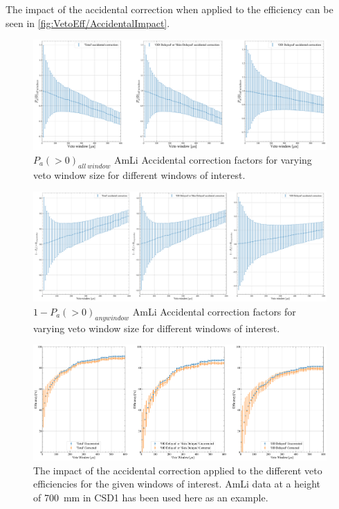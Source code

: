 The impact of the accidental correction when applied to the efficiency can be seen in \autoref{fig:VetoEff/AccidentalImpact}.
\begin{figure}[!ht]
	\centering
	\includegraphics[width=\textwidth]{figures/VetoEfficiency/SR3AmLi_700_Corrections_100k_P0.pdf}
	\caption{$P_a(>0)_{all\:window}$ AmLi Accidental correction factors for varying veto window size for different windows of interest.}
	\label{fig:VetoEff/AccCorr}
\end{figure}
\begin{figure}[!ht]
	\centering
	\includegraphics[width=\textwidth]{figures/VetoEfficiency/SR3AmLi_700_Corrections_100k_P0-1.pdf}
	\caption{$1 - P_a(>0)_{any window}$ AmLi Accidental correction factors for varying veto window size for different windows of interest.}
	\label{fig:VetoEff/AccCorr_P0-1}
\end{figure}
\begin{figure}[!ht]
	\centering
	\includegraphics[width=\textwidth]{figures/VetoEfficiency/AccidentalCorrectionImpact.pdf}
	\caption{The impact of the accidental correction applied to the different veto efficiencies for the given windows of interest. AmLi data at a height of 700~mm in CSD1 has been used here as an example.}
	\label{fig:VetoEff/AccidentalImpact}
\end{figure}


